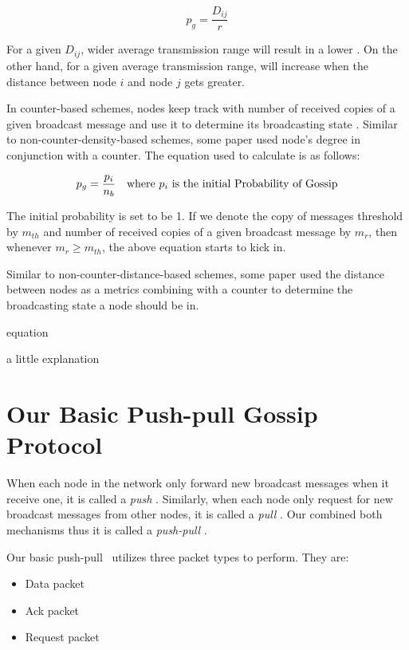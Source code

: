 \[ p_g = \frac{D_{ij}}{r}\]

For a given $D_{ij}$, wider average transmission range will result in a lower \emph{\pog}. On the other hand, for a given average transmission range, \emph{\pog} will increase when the distance between node $i$ and node $j$ gets greater.

In counter-based schemes, nodes keep track with number of received copies of a given broadcast message and use it to determine its broadcasting state \cite{2015survey}. Similar to non-counter-density-based schemes, some paper \cite{lee2010adaptive} used node's degree in conjunction with a counter. The equation used to calculate \emph{\pog} is as follows:

\[ p_g = \frac{p_i}{n_b} \quad \mbox{where } p_i \mbox{ is the initial Probability of Gossip}\]

The initial probability is set to be 1. If we denote the copy of messages threshold by $m_{th}$ and number of received copies of a given broadcast message by $m_r$, then whenever $m_r \geq m_{th}$, the above equation starts to kick in.

Similar to non-counter-distance-based schemes, some paper \cite{} used the distance between nodes as a metrics combining with a counter to determine the broadcasting state a node should be in. 

equation

a little explanation


\section{Our Basic Push-pull Gossip Protocol}
When each node in the network only forward new broadcast messages when it receive one, it is called a \emph{push} \gp. Similarly, when each node only request for new broadcast messages from other nodes, it is called  a \emph{pull} \gp. Our \gp combined both mechanisms thus it is called a \emph{push-pull} \gp. 

Our basic push-pull \gp ~utilizes three packet types to perform. They are:
\begin{itemize}
	\item Data packet
	\item Ack packet 
	\item Request packet
\end{itemize}

